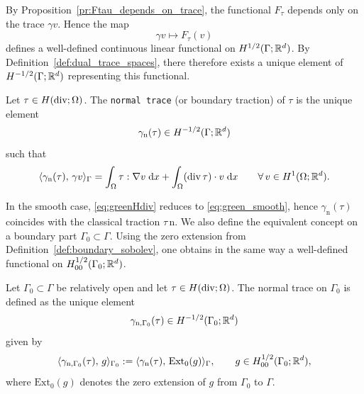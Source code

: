 By Proposition~\ref{pr:Ftau_depends_on_trace}, the functional $F_\tau$ depends only on the trace $\gamma v$. Hence the map
\begin{equation*}
	\gamma v \mapsto F_\tau(v)
\end{equation*}
defines a well-defined continuous linear functional on $H^{1/2}(\Gamma;{\mathbb R}^d)$. By Definition~\ref{def:dual_trace_spaces}, there therefore exists a unique element of $H^{-1/2}(\Gamma;{\mathbb R}^d)$ representing this functional.

\begin{definition}\label{def:normal_trace}
	Let $\tau\in H(\diver;\Omega)$. The {\tt normal trace} (or boundary traction) of $\tau$ is the unique element
	\begin{equation*}
		\gamma_{\mathrm{n}}(\tau)\in H^{-1/2}(\Gamma;{\mathbb R}^d)
	\end{equation*}
	such that
	\begin{equation}\label{eq:greenHdiv}
		\langle \gamma_{\mathrm{n}}(\tau),\,\gamma v\rangle_{\Gamma}
		=
		\int_\Omega \tau:\nabla v\;\dx + \int_\Omega (\diver\tau)\cdot v\;\dx
		\qquad\forall\,v\in H^1(\Omega;\R^d).
	\end{equation}
\end{definition}

In the smooth case, \eqref{eq:greenHdiv} reduces to \eqref{eq:green_smooth}, hence $\gamma_{\mathrm{n}}(\tau)$ coincides with the classical traction $\tau\,\mathrm n$. We also define the equivalent concept on a boundary part $\Gamma_0\subset\Gamma$. Using the zero extension from Definition~\ref{def:boundary_sobolev}, one obtains in the same way a well-defined functional on $H^{1/2}_{00}(\Gamma_0;{\mathbb R}^d)$.

\begin{definition}\label{def:normal_trace_part}
	Let $\Gamma_0\subset\Gamma$ be relatively open and let $\tau\in H(\diver;\Omega)$. The normal trace on $\Gamma_0$ is defined as the unique element
	\begin{equation*}
		\gamma_{\mathrm{n},\Gamma_0}(\tau)\in H^{-1/2}(\Gamma_0;{\mathbb R}^d)
	\end{equation*}
	given by
	\begin{equation*}
		\langle \gamma_{\mathrm{n},\Gamma_0}(\tau),\,g\rangle_{\Gamma_0}
		:=
		\langle \gamma_{\mathrm{n}}(\tau),\,\mathrm{Ext}_0 (g)\rangle_{\Gamma},
		\qquad g\in H^{1/2}_{00}(\Gamma_0;{\mathbb R}^d),
	\end{equation*}
	where $\mathrm{Ext}_0 (g)$ denotes the zero extension of $g$ from $\Gamma_0$ to $\Gamma$.
\end{definition}